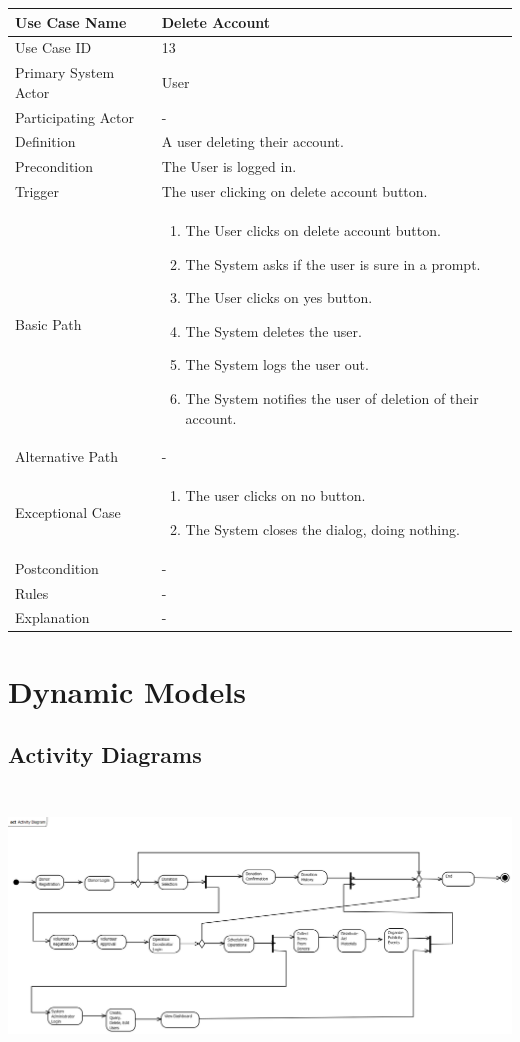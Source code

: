 \documentclass[a4paper,12pt]{report}
\begin{document}
		\begin{tabular}{|m{4cm}|m{11.5cm}|}
			\hline
				Use Case Name & Delete Account\\
			\hline
				Use Case ID & 13\\
			\hline
				Primary System Actor & User\\
			\hline
				Participating Actor & -\\
			\hline
				Definition & A user deleting their account.\\
			\hline
				Precondition & The User is logged in.\\
			\hline
				Trigger & The user clicking on delete account button.\\
			\hline
				Basic Path & \begin{enumerate}
					\item The User clicks on delete account button.
					\item The System asks if the user is sure in a prompt.
					\item The User clicks on yes button.
					\item The System deletes the user.
					\item The System logs the user out.
					\item The System notifies the user of deletion of their account.
				\end{enumerate}		
				\\
			\hline
				Alternative Path & -\\
			\hline
				Exceptional Case & \begin{enumerate}
					\item The user clicks on no button.
					\item The System closes the dialog, doing nothing.
				\end{enumerate}
				\\
			\hline
				Postcondition & -\\
			\hline
				Rules & -\\
			\hline
				Explanation & -\\
			\hline
		\end{tabular}
	\section{Dynamic Models}
		\subsection{Activity Diagrams}
			\includegraphics[width=468pt,height=208pt]{Activity_Diagram.png} %
\end{document}
